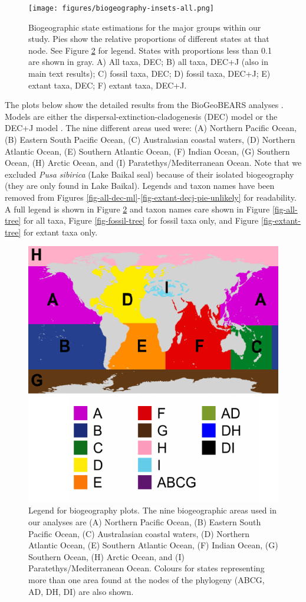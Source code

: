 \documentclass[a4paper, 12pt]{article}
\begin{document}
\begin{figure}[H]
 \centering
  \texttt{[image: figures/biogeography-insets-all.png]}
  \caption{Biogeographic state estimations for the major groups within our study. Pies show the relative proportions of different states at that node. See Figure \ref{fig-legend} for legend. States with proportions less than 0.1 are shown in gray. A) All taxa, DEC; B) all taxa, DEC+J (also in main text results); C) fossil taxa, DEC; D) fossil taxa, DEC+J; E) extant taxa, DEC; F) extant taxa, DEC+J.}
  \label{fig-nodes}
\end{figure} 



The plots below show the detailed results from the BioGeoBEARS analyses \citep{matzke2013probabilistic}. Models are either the dispersal-extinction-cladogenesis (DEC) model \citep{ree2008maximum} or the DEC+J model \citep{matzke2014model}. 
The nine different areas used were: (A) Northern Pacific Ocean, (B) Eastern South Pacific Ocean, (C) Australasian coastal waters, (D) Northern Atlantic Ocean, (E) Southern Atlantic Ocean, (F) Indian Ocean, (G) Southern Ocean, (H) Arctic Ocean, and (I) Paratethys/Mediterranean Ocean. Note that we excluded \textit{Pusa sibirica} (Lake Baikal seal) because of their isolated biogeography (they are only found in Lake Baikal). 
Legends and taxon names have been removed from Figures \ref{fig-all-dec-ml}-\ref{fig-extant-decj-pie-unlikely} for readability. 
A full legend is shown in Figure \ref{fig-legend} and taxon names care shown in Figure \ref{fig-all-tree} for all taxa, Figure \ref{fig-fossil-tree} for fossil taxa only, and Figure \ref{fig-extant-tree} for extant taxa only.

\begin{figure}[H]
 \centering
  \includegraphics[width = 0.5\linewidth]{figures/BGB-legend.pdf}
  \caption{Legend for biogeography plots. The nine biogeographic areas used in our analyses are (A) Northern Pacific Ocean, (B) Eastern South Pacific Ocean, (C) Australasian coastal waters, (D) Northern Atlantic Ocean, (E) Southern Atlantic Ocean, (F) Indian Ocean, (G) Southern Ocean, (H) Arctic Ocean, and (I) Paratethys/Mediterranean Ocean. Colours for states representing more than one area found at the nodes of the phylogeny (ABCG, AD, DH, DI) are also shown.}
  \label{fig-legend}
\end{figure} 
\end{document}
